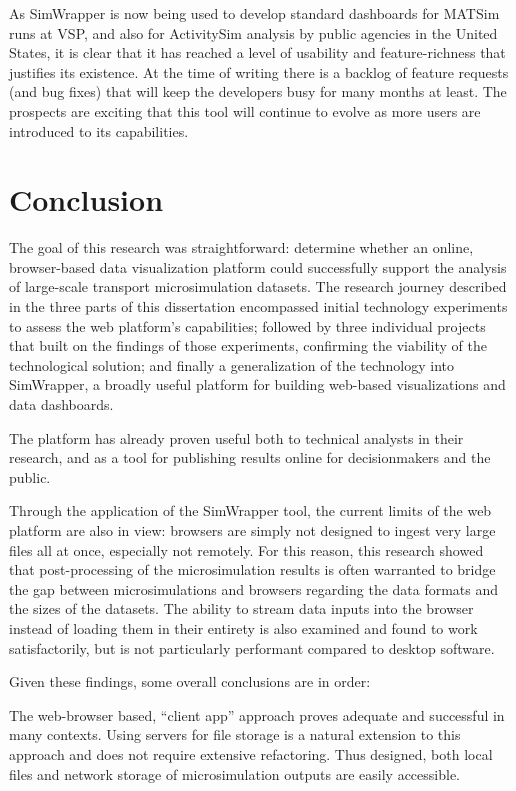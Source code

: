 
As SimWrapper is now being used to develop standard dashboards for MATSim runs at VSP, and also for ActivitySim analysis by public agencies in the United States, it is clear that it has reached a level of usability and feature-richness that justifies its existence. At the time of writing there is a backlog of feature requests (and bug fixes) that will keep the developers busy for many months at least. The prospects are exciting that this tool will continue to evolve as more users are introduced to its capabilities.

\section{Conclusion}
\label{08-conclusions-conclusion}

The goal of this research was straightforward: determine whether an online, browser-based data visualization platform could successfully support the analysis of large-scale transport microsimulation datasets. The research journey described in the three parts of this dissertation encompassed initial technology experiments to assess the web platform's capabilities; followed by three individual projects that built on the findings of those experiments, confirming the viability of the technological solution; and finally a generalization of the technology into SimWrapper, a broadly useful platform for building web-based visualizations and data dashboards.

The platform has already proven useful both to technical analysts in their research, and as a tool for publishing results online for decisionmakers and the public.

Through the application of the SimWrapper tool, the current limits of the web platform are also in view: browsers are simply not designed to ingest very large files all at once, especially not remotely. For this reason, this research showed that post-processing of the microsimulation results is often warranted to bridge the gap between microsimulations and browsers regarding the data formats and the sizes of the datasets. The ability to stream data inputs into the browser instead of loading them in their entirety is also examined and found to work satisfactorily, but is not particularly performant compared to desktop software.

Given these findings, some overall conclusions are in order:

The web-browser based, ``client app'' approach proves adequate and successful in many contexts. Using servers for file storage is a natural extension to this approach and does not require extensive refactoring. Thus designed, both local files and network storage of microsimulation outputs are easily accessible.

